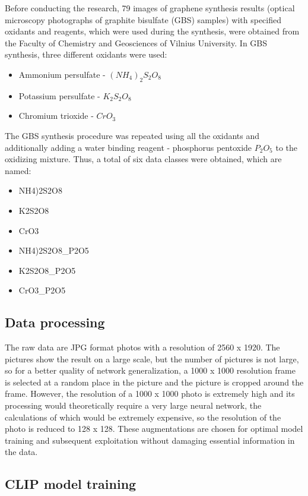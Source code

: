 \documentclass[runningheads]{llncs}
\begin{document}
Before conducting the research, 79 images of graphene synthesis results (optical microscopy photographs of graphite bisulfate (GBS) samples) with specified oxidants and reagents, which were used during the synthesis, were obtained from the Faculty of Chemistry and Geosciences of Vilnius University. In GBS synthesis, three different oxidants were used:
\begin{itemize}
    \item Ammonium persulfate - $(NH_4)_2S_2O_8$
    \item Potassium persulfate - $K_2S_2O_8$
    \item Chromium trioxide - $CrO_3$
\end{itemize}
The GBS synthesis procedure was repeated using all the oxidants and additionally adding a water binding reagent - phosphorus pentoxide $P_2O_5$ to the oxidizing mixture. Thus, a total of six data classes were obtained, which are named:\\
\begin{itemize}
    \item NH4)2S2O8
    \item K2S2O8
    \item CrO3
    \item NH4)2S2O8\_P2O5
    \item K2S2O8\_P2O5
    \item CrO3\_P2O5
\end{itemize}

\subsection{Data processing}

The raw data are JPG format photos with a resolution of 2560 x 1920. The pictures show the result on a large scale, but the number of pictures is not large, so for a better quality of network generalization, a 1000 x 1000 resolution frame is selected at a random place in the picture and the picture is cropped around the frame. However, the resolution of a 1000 x 1000 photo is extremely high and its processing would theoretically require a very large neural network, the calculations of which would be extremely expensive, so the resolution of the photo is reduced to 128 x 128. These augmentations are chosen for optimal model training and subsequent exploitation without damaging essential information in the data.

\subsection{CLIP model training}
\end{document}
